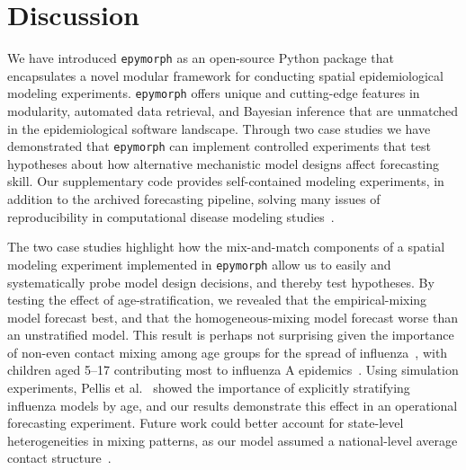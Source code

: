 \section{Discussion}\label{sec:discussion}

We have introduced \texttt{epymorph} as an open-source Python package that encapsulates a novel modular framework for conducting spatial epidemiological modeling experiments.
\texttt{epymorph} offers unique and cutting-edge features in modularity, automated data retrieval, and Bayesian inference that are unmatched in the epidemiological software landscape. 
Through two case studies we have demonstrated that \texttt{epymorph} can implement controlled experiments that test hypotheses about how alternative mechanistic model designs affect forecasting skill.
Our supplementary code provides self-contained modeling experiments, in addition to the archived forecasting pipeline, solving many issues of reproducibility in computational disease modeling studies~\citep{henderson_reproducibility_2024,oshinubi_systematic_2026,pokutnaya_implementation_2023}.

The two case studies highlight how the mix-and-match components of a spatial modeling experiment implemented in \texttt{epymorph} allow us to easily and systematically probe model design decisions, and thereby test hypotheses.  
By testing the effect of age-stratification, we revealed that the empirical-mixing model forecast best, and that the homogeneous-mixing model forecast worse than an unstratified model.
This result is perhaps not surprising given the importance of non-even contact mixing among age groups for the spread of influenza~\citep{mossong_social_2008, wallinga_using_2006}, with children aged 5--17 contributing most to influenza A epidemics~\citep{worby_relative_2015}.
Using simulation experiments, Pellis et al.~\citep{pellis_systematic_2020} showed the importance of explicitly stratifying influenza models by age, and our results demonstrate this effect in an operational forecasting experiment. 
Future work could better account for state-level heterogeneities in mixing patterns, as our model assumed a national-level average contact structure~\citep{mistry_inferring_2021,prem_projecting_2017, arregui_projecting_2018}. 

